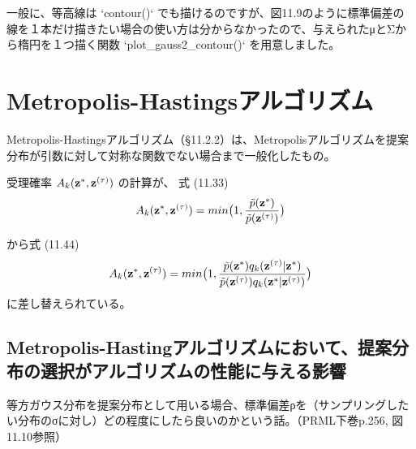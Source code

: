 \documentclass{jsarticle}
\begin{document}
一般に、等高線は `contour()` でも描けるのですが、図11.9のように標準偏差の線を１本だけ描きたい場合の使い方は分からなかったので、与えられたμとΣから楕円を１つ描く関数 `plot\_gauss2\_contour()` を用意しました。

\section{Metropolis-Hastingsアルゴリズム}
Metropolis-Hastingsアルゴリズム（§11.2.2）は、Metropolisアルゴリズムを提案分布が引数に対して対称な関数でない場合まで一般化したもの。

受理確率 $A_k({\bf z}^*,{\bf z}^{(\tau)})$ の計算が、
式 (11.33)
\begin{equation}
A_k({\bf z}^*,{\bf z}^{(\tau)})=min\bigl(1,\frac{\tilde{p}({\bf z}^*)}{\tilde{p}({\bf z}^{(\tau)})}\bigr)
\end{equation}

から式 (11.44)
\begin{equation}
A_k({\bf z}^*,{\bf z}^{(\tau)})=min\bigl(1,\frac{\tilde{p}({\bf z}^*)q_k({\bf z}^{(\tau)}|{\bf z}^*)}{\tilde{p}({\bf z}^{(\tau)})q_k({\bf z}^*|{\bf z}^{(\tau)})}\bigr)
\end{equation}
に差し替えられている。

\subsection{Metropolis-Hastingアルゴリズムにおいて、提案分布の選択がアルゴリズムの性能に与える影響}

等方ガウス分布を提案分布として用いる場合、標準偏差ρを（サンプリングしたい分布のσに対し）どの程度にしたら良いのかという話。（PRML下巻p.256, 図11.10参照）
\end{document}
